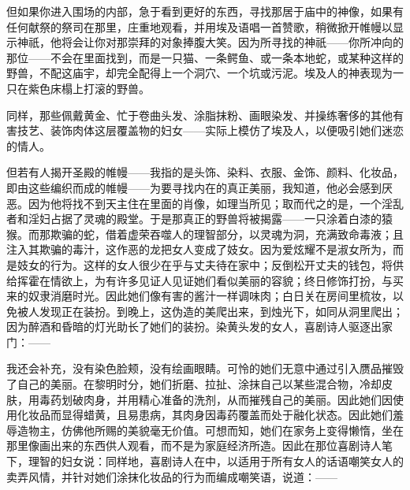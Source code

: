 但如果你进入围场的内部，急于看到更好的东西，寻找那居于庙中的神像，如果有任何献祭的祭司在那里，庄重地观看，并用埃及语唱一首赞歌，稍微掀开帷幔以显示神祇，他将会让你对那崇拜的对象捧腹大笑。因为所寻找的神祇——你所冲向的那位——不会在里面找到，而是一只猫、一条鳄鱼、或一条本地蛇，或某种这样的野兽，不配这庙宇，却完全配得上一个洞穴、一个坑或污泥。埃及人的神表现为一只在紫色床榻上打滚的野兽。\par

同样，那些佩戴黄金、忙于卷曲头发、涂脂抹粉、画眼染发、并操练奢侈的其他有害技艺、装饰肉体这层覆盖物的妇女——实际上模仿了埃及人，以便吸引她们迷恋的情人。\par

但若有人揭开圣殿的帷幔——我指的是头饰、染料、衣服、金饰、颜料、化妆品，即由这些编织而成的帷幔——为要寻找内在的真正美丽，我知道，他必会感到厌恶。因为他将找不到天主住在里面的肖像，如理当所见；取而代之的是，一个淫乱者和淫妇占据了灵魂的殿堂。于是那真正的野兽将被揭露——一只涂着白漆的猿猴。而那欺骗的蛇，借着虚荣吞噬人的理智部分，以灵魂为洞，充满致命毒液；且注入其欺骗的毒汁，这作恶的龙把女人变成了妓女。因为爱炫耀不是淑女所为，而是妓女的行为。这样的女人很少在乎与丈夫待在家中；反倒松开丈夫的钱包，将供给挥霍在情欲上，为有许多见证人见证她们看似美丽的容貌；终日修饰打扮，与买来的奴隶消磨时光。因此她们像有害的酱汁一样调味肉；白日关在房间里梳妆，以免被人发现正在装扮。到晚上，这伪造的美爬出来，到烛光下，如同从洞里爬出；因为醉酒和昏暗的灯光助长了她们的装扮。染黄头发的女人，喜剧诗人驱逐出家门：——\par

\par

我还会补充，没有染色脸颊，没有绘画眼睛。可怜的她们无意中通过引入赝品摧毁了自己的美丽。在黎明时分，她们折磨、拉扯、涂抹自己以某些混合物，冷却皮肤，用毒药划破肉身，并用精心准备的洗剂，从而摧残自己的美丽。因此她们因使用化妆品而显得蜡黄，且易患病，其肉身因毒药覆盖而处于融化状态。因此她们羞辱造物主，仿佛他所赐的美貌毫无价值。可想而知，她们在家务上变得懒惰，坐在那里像画出来的东西供人观看，而不是为家庭经济所造。因此在那位喜剧诗人笔下，理智的妇女说：同样地，喜剧诗人在中，以适用于所有女人的话语嘲笑女人的卖弄风情，并针对她们涂抹化妆品的行为而编成嘲笑语，说道：——\par

\par

